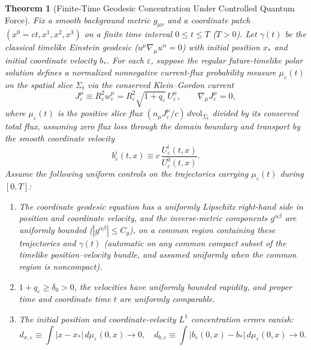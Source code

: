 \documentclass[11pt, a4paper]{article}
\newtheorem{theorem}{Theorem}[section]
\theoremstyle{definition}
\begin{document}
\begin{theorem}[Finite-Time Geodesic Concentration Under Controlled Quantum Force]
\label{cor:macroscopic_geodesics}
Fix a smooth background metric $g_{\mu\nu}$ and a coordinate patch $(x^0 = ct, x^1, x^2, x^3)$ on a finite time interval $0 \le t \le T$ ($T > 0$). Let $\gamma(t)$ be the classical timelike Einstein geodesic ($u^\mu\nabla_\mu u^\alpha = 0$) with initial position $x_*$ and initial coordinate velocity $b_*$. For each $\varepsilon$, suppose the regular future-timelike polar solution defines a normalized nonnegative current-flux probability measure $\mu_\varepsilon(t)$ on the spatial slice $\Sigma_t$ via the conserved Klein--Gordon current
\begin{equation}
\label{eq:wkb_conserved_current}
J_\varepsilon^\mu \equiv R_\varepsilon^2 w_\varepsilon^\mu = R_\varepsilon^2 \sqrt{1 + q_\varepsilon}\,U_\varepsilon^\mu, \qquad \nabla_\mu J_\varepsilon^\mu = 0,
\end{equation}
where $\mu_\varepsilon(t)$ is the positive slice flux $(n_\mu J_\varepsilon^\mu / c)\,d\mathrm{vol}_{\Sigma_t}$ divided by its conserved total flux, assuming zero flux loss through the domain boundary and transport by the smooth coordinate velocity
\begin{equation}
\label{eq:wkb_coord_velocity}
b_\varepsilon^i(t, x) \equiv c\,\frac{U_\varepsilon^i(t, x)}{U_\varepsilon^0(t, x)}.
\end{equation}
Assume the following uniform controls on the trajectories carrying $\mu_\varepsilon(t)$ during $[0, T]$:
\begin{enumerate}[label=(\arabic*)]
    \item The coordinate geodesic equation has a uniformly Lipschitz right-hand side in position and coordinate velocity, and the inverse-metric components $g^{\alpha\beta}$ are uniformly bounded ($|g^{\alpha\beta}| \le C_g$), on a common region containing these trajectories and $\gamma(t)$ (automatic on any common compact subset of the timelike position--velocity bundle, and assumed uniformly when the common region is noncompact).
    \item $1 + q_\varepsilon \ge \delta_0 > 0$, the velocities have uniformly bounded rapidity, and proper time and coordinate time $t$ are uniformly comparable.
    \item The initial position and coordinate-velocity $L^1$ concentration errors vanish:
    \begin{equation}
    \label{eq:initial_wkb_concentration}
    d_{x,\varepsilon} \equiv \int |x - x_*|\,d\mu_\varepsilon(0, x) \to 0, \quad d_{b,\varepsilon} \equiv \int |b_\varepsilon(0, x) - b_*|\,d\mu_\varepsilon(0, x) \to 0.

\end{equation}
\end{enumerate}
\end{theorem}
\end{document}
